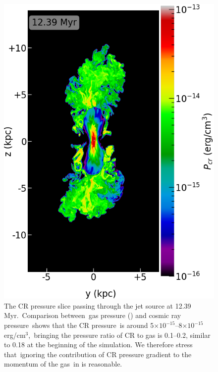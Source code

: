 \documentclass[twocolumn]{aastex631}
\begin{document}
  \begin{figure}
    \includegraphics[width=\columnwidth]{figures/fig__jetI5+ismSeed3-45deg-CR.png}
    \caption{
     The CR pressure slice passing through the jet source at 12.39 Myr.\
     Comparison between\
     gas pressure () and cosmic ray pressure\
     shows that
     the CR pressure\
     is around 5$\times10^{-15}$--8$\times10^{-15}$ erg/cm$^{3}$,\
     bringing the pressure ratio of CR to gas is 0.1--0.2,
     similar to 0.18 at the beginning of the simulation.
     We therefore stress that\
     ignoring the contribution of CR pressure gradient to the momentum of the gas\
     in  is reasonable.
     }
    \label{fig__jetI5+ismSeed3-45deg-CR}
  \end{figure}
\end{document}

